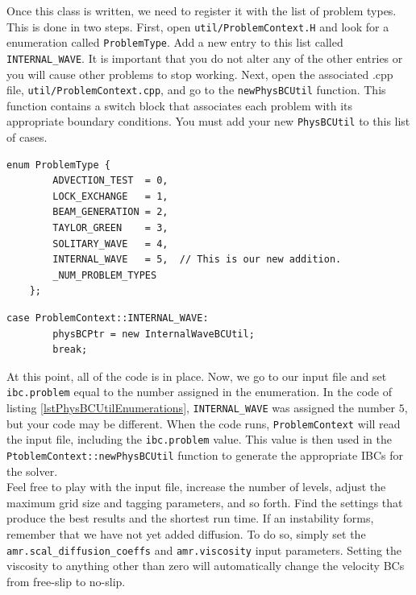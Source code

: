 \documentclass[12pt]{article}
\begin{document}
Once this class is written, we need to register it with the list of problem types. This is done in two steps. First, open \texttt{util/ProblemContext.H} and look for a enumeration called \texttt{ProblemType}. Add a new entry to this list called \texttt{INTERNAL\_WAVE}. It is important that you do not alter any of the other entries or you will cause other problems to stop working. Next, open the associated .cpp file, \texttt{util/ProblemContext.cpp}, and go to the \texttt{newPhysBCUtil} function. This function contains a switch block that associates each problem with its appropriate boundary conditions. You must add your new \texttt{PhysBCUtil} to this list of cases.
\begin{lstlisting}[caption={The \texttt{ProblemContext} enumeration.},label=lstPhysBCUtilEnumerations]
    enum ProblemType {
        ADVECTION_TEST  = 0,
        LOCK_EXCHANGE   = 1,
        BEAM_GENERATION = 2,
        TAYLOR_GREEN    = 3,
        SOLITARY_WAVE   = 4,
        INTERNAL_WAVE   = 5,  // This is our new addition.
        _NUM_PROBLEM_TYPES
    };
\end{lstlisting}
\begin{lstlisting}[caption={The new addition to the \texttt{ProblemContext::newPhysBCUtil} switch block.}]
    case ProblemContext::INTERNAL_WAVE:
        physBCPtr = new InternalWaveBCUtil;
        break;
\end{lstlisting}

At this point, all of the code is in place. Now, we go to our input file and set \texttt{ibc.problem} equal to the number assigned in the enumeration. In the code of listing \ref{lstPhysBCUtilEnumerations}, \texttt{INTERNAL\_WAVE} was assigned the number $5$, but your code may be different. When the code runs, \texttt{ProblemContext} will read the input file, including the \texttt{ibc.problem} value. This value is then used in the \texttt{PtoblemContext::newPhysBCUtil} function to generate the appropriate IBCs for the solver.\\

Feel free to play with the input file, increase the number of levels, adjust the maximum grid size and tagging parameters, and so forth. Find the settings that produce the best results and the shortest run time. If an instability forms, remember that we have not yet added diffusion. To do so, simply set the \texttt{amr.scal\_diffusion\_coeffs} and \texttt{amr.viscosity} input parameters. Setting the viscosity to anything other than zero will automatically change the velocity BCs from free-slip to no-slip.
\end{document}
